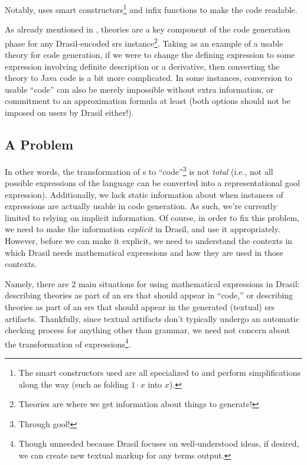 \pseudoExampleExpression{}

Notably,  uses smart constructors\footnote{The
smart constructors used are all specialized to \Expr{} and perform
simplifications along the way (such as folding \(1 \cdot x\) into \(x\)).} and
infix functions to make the code readable. 

As already mentioned in , theories are a key component of
the code generation phase for any Drasil-encoded \acs{srs}
instance\footnote{Theories are where we get information about things to
generate!}. Taking  as an example of a usable theory
for code generation, if we were to change the defining expression to some
expression involving definite description or a derivative, then converting the
theory to Java code is a bit more complicated. In some instances, conversion to
usable ``code'' can also be merely impossible without extra information, or
commitment to an approximation formula at least (both options should not be
imposed on users by Drasil either!).

\subsection{A Problem}
\label{chap:lang-division:sec:a-mathematical-language:subsec:a-problem}

In other words, the transformation of \Expr{}s to ``code''\footnote{Through
\acs{gool}!} is not \textit{total} (i.e., not all possible expressions of the
\Expr{} language can be converted into a representational \acs{gool}
expression). Additionally, we lack static information about when instances of
expressions are actually usable in code generation. As such, we're currently
limited to relying on implicit information. Of course, in order to fix this
problem, we need to make the information \textit{explicit} in Drasil, and use it
appropriately. However, before we can make it explicit, we need to understand
the contexts in which Drasil needs mathematical expressions and how they are
used in those contexts.

Namely, there are 2 main situations for using mathematical expressions in
Drasil: describing theories as part of an \acs{srs} that should appear in
``code,'' or describing theories as part of an \acs{srs} that should appear in
the generated (textual) \acs{srs} artifacts. Thankfully, since textual artifacts
don't typically undergo an automatic checking process for anything other than
grammar, we need not concern about the transformation of
expressions\footnote{Though unneeded because Drasil focuses on well-understood
ideas, if desired, we can create new textual markup for any terms output.}.

